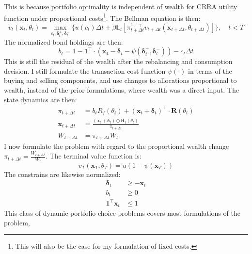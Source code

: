 \documentclass[11pt]{article}
\begin{document}
This is because portfolio optimality is independent of wealth for CRRA utility function under proportional costs\footnote{This will also be the case for my formulation of fixed costs.}. 
The Bellman equation is then:
\begin{equation} \label{eq: class_bellman}
  v_{t} (\mathbf{x}_{t}, \theta_t) = \max_{c_t , \boldsymbol{\delta}^{+}_{t}, \boldsymbol{\delta}^{-}_{t} } \{ u(c_t) 
  \Delta t + \beta \mathbb{E}_{t} \left[ 
    \pi_{t+\Delta t}^{1-\gamma}
    v_{t+\Delta t} (\mathbf{x}_{t+\Delta t }, \theta_{t + \Delta t }  ) 
    \right] \} , \quad t < T 
\end{equation}
The normalized bond holdings are then:
\begin{equation}\label{eq: class_bond_holdings}
  b_{t} = 1 - \mathbf{1}^{\top} \cdot (\mathbf{x_t} - \boldsymbol{\delta}_t - \psi( \boldsymbol{\delta}^{+}_{t}, \boldsymbol{\delta}^{-}_{t}  )) - c_t \Delta t
\end{equation}
This is still the residual of the wealth after the rebalancing and consumption decision.
I still formulate the transaction cost function $\psi(\cdot)$ in terms of the buying and selling components,
and use changes to allocations proportional to wealth, instead of the prior formulations, where wealth was a direct input.
The state dynamics are then:
\begin{align}
  \pi_{t+\Delta t} &= b_t R_f (\theta_t)  + (\mathbf{x}_t + \boldsymbol{\delta}_t)^{\top} \cdot \mathbf{R}(\theta_t) \\
  \mathbf{x}_{t+\Delta t} &=  \frac{(\mathbf{x}_t + \boldsymbol{\delta}_t) \odot \mathbf{R}_t (\theta_t )}{ \pi_{t+\Delta t} } \\
  W_{t+\Delta t} &= \pi_{t+\Delta t} W_t
\end{align}
I now formulate the problem with regard to the proportional wealth change $\pi_{t+\Delta t} = \frac{W_{t+\Delta t}}{W_t}$.
The terminal value function is:
\begin{equation} \label{eq: class_terminal_value}
  v_T (\mathbf{x}_T , \theta_T ) = u (1 - \psi(\mathbf{x}_T)) 
\end{equation}
The constrains are likewise normalized:
\begin{align}
  \boldsymbol{\delta}_t &\geq - \mathbf{x}_t \label{eq: No_Short_risky} \\
  b_t &\geq 0 \label{eq: No_Short_bonds}\\
  \mathbf{1}^{\top} \mathbf{x}_t &\leq 1 \label{eq: No_Geared_Risky}
\end{align}
This class of dynamic portfolio choice problems covers most formulations of the problem,
\end{document}
